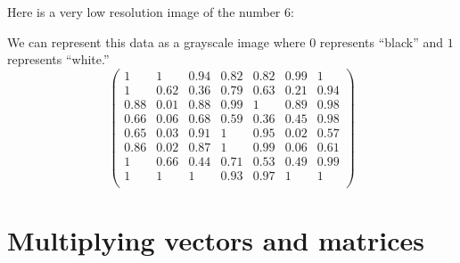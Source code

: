 \documentclass{ximera}
\begin{document}
\begin{example}
  Here is a very low resolution image of the number $6$:
  \begin{center}  
\newcommand{\matrixData}{{
    {0, 0.01, 0, 0, 0, 0, 0},
    {0, 0, 0.06, 0.18, 0.18, 0.01, 0},
    {0, 0.38, 0.64, 0.21, 0.37, 0.79, 0.06},
    {0.12, 0.99, 0.12, 0.01, 0, 0.11, 0.02},
    {0.34, 0.94, 0.32, 0.41, 0.64, 0.55, 0.02},
    {0.35, 0.97, 0.09, 0, 0.05, 0.98, 0.43}, {0.14, 0.98, 0.13, 0, 0.01, 0.94, 
  0.39}, {0, 0.34, 0.56, 0.29, 0.47, 0.51, 0.01}, {0, 0, 0, 0.07, 
  0.03, 0, 0}, {0, 0.01, 0, 0, 0, 0.02, 0}
}}
  \end{center}
  We can represent this data as a grayscale image where $0$ represents ``black'' and $1$ represents ``white.''
  \[
  \begin{pmatrix}
     1 & 1 & 0.94 & 0.82 & 0.82 & 0.99 & 1 \\
     1 & 0.62 & 0.36 & 0.79 & 0.63 & 0.21 & 0.94 \\
     0.88 & 0.01 & 0.88 & 0.99 & 1 & 0.89 & 0.98 \\
     0.66 & 0.06 & 0.68 & 0.59 & 0.36 & 0.45 & 0.98 \\
     0.65 & 0.03 & 0.91 & 1 & 0.95 & 0.02 & 0.57 \\
     0.86 & 0.02 & 0.87 & 1 & 0.99 & 0.06 & 0.61 \\
     1 & 0.66 & 0.44 & 0.71 & 0.53 & 0.49 & 0.99 \\
     1 & 1 & 1 & 0.93 & 0.97 & 1 & 1 \\
  \end{pmatrix}
  \]
\end{example}













\section{Multiplying vectors and matrices}
\end{document}
